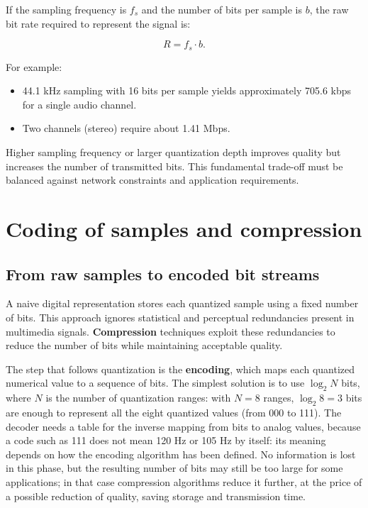 If the sampling frequency is $f_s$ and the number of bits per sample is $b$, the raw bit rate required to represent the signal is:

\[ R = f_s \cdot b. \]

For example:

\begin{itemize}
\item 44.1 kHz sampling with 16 bits per sample yields approximately 705.6 kbps for a single audio channel.
\item Two channels (stereo) require about 1.41 Mbps.
\end{itemize}

Higher sampling frequency or larger quantization depth improves quality but increases the number of transmitted bits. This fundamental trade-off must be balanced against network constraints and application requirements.

\section{Coding of samples and compression}

\subsection{From raw samples to encoded bit streams}

A naive digital representation stores each quantized sample using a fixed number of bits. This approach ignores statistical and perceptual redundancies present in multimedia signals. \textbf{Compression} techniques exploit these redundancies to reduce the number of bits while maintaining acceptable quality.


The step that follows quantization is the \textbf{encoding}, which maps each quantized numerical value to a sequence of bits. The simplest solution is to use $\log_2 N$ bits, where $N$ is the number of quantization ranges: with $N = 8$ ranges, $\log_2 8 = 3$ bits are enough to represent all the eight quantized values (from 000 to 111). The decoder needs a table for the inverse mapping from bits to analog values, because a code such as 111 does not mean 120 Hz or 105 Hz by itself: its meaning depends on how the encoding algorithm has been defined. No information is lost in this phase, but the resulting number of bits may still be too large for some applications; in that case compression algorithms reduce it further, at the price of a possible reduction of quality, saving storage and transmission time.

